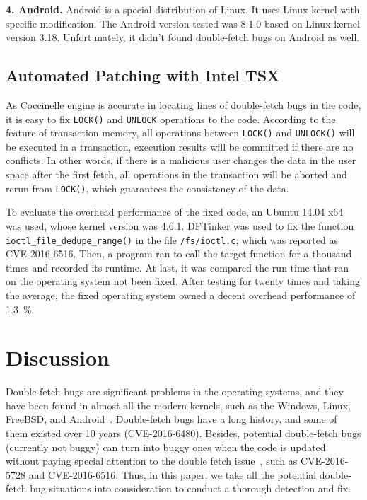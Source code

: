 \documentclass[10pt]{llncs}
\begin{document}
\textbf{4. Android.}
Android is a special distribution of Linux. It uses Linux kernel with specific modification. The Android version tested was 8.1.0 based on Linux kernel version 3.18. Unfortunately, it didn't found double-fetch bugs on Android as well.

\subsection{Automated Patching with Intel TSX}
\label{evalue2}

As Coccinelle engine is accurate in locating lines of double-fetch bugs in the code, it is easy to fix \verb:LOCK(): and \verb:UNLOCK: operations to the code. According to the feature of transaction memory, all operations between \verb:LOCK(): and \verb:UNLOCK(): will be executed in a transaction, execution results will be committed if there are no conflicts. In other words, if there is a malicious user changes the data in the user space after the first fetch, all operations in the transaction will be aborted and rerun from \verb:LOCK():, which guarantees the consistency of the data.

To evaluate the overhead performance of the fixed code, an Ubuntu 14.04 x64 was used, whose kernel version was 4.6.1. DFTinker was used to fix the function \verb:ioctl_file_dedupe_range(): in the file \verb:/fs/ioctl.c:, which was reported as CVE-2016-6516. Then, a program ran to call the target function for a thousand times and recorded its runtime. At last, it was compared the run time that ran on the operating system not been fixed. After testing for twenty times and taking the average, the fixed operating system owned a decent overhead performance of 1.3~\%.

\section{Discussion}%
\label{discuss}

Double-fetch bugs are significant problems in the operating systems, and they have been found in almost all the modern kernels, such as the Windows, Linux, FreeBSD, and Android~\cite{wang}. Double-fetch bugs have a long history, and some of them existed over 10 years (CVE-2016-6480). Besides, potential double-fetch bugs (currently not buggy) can turn into buggy ones when the code is updated without paying special attention to the double fetch issue~\cite{wang}, such as CVE-2016-5728 and CVE-2016-6516. Thus, in this paper, we take all the potential double-fetch bug situations into consideration to conduct a thorough detection and fix.
\end{document}
